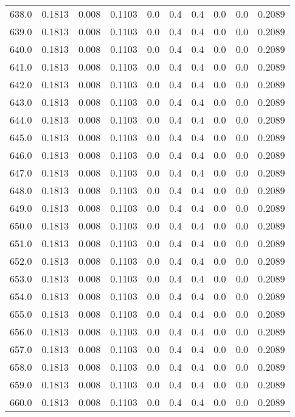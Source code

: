 \begin{longtable}{lrrrrrrrrr}
638.0 & 0.1813 & 0.008 & 0.1103 & 0.0 & 0.4 & 0.4 & 0.0 & 0.0 & 0.2089 \\
639.0 & 0.1813 & 0.008 & 0.1103 & 0.0 & 0.4 & 0.4 & 0.0 & 0.0 & 0.2089 \\
640.0 & 0.1813 & 0.008 & 0.1103 & 0.0 & 0.4 & 0.4 & 0.0 & 0.0 & 0.2089 \\
641.0 & 0.1813 & 0.008 & 0.1103 & 0.0 & 0.4 & 0.4 & 0.0 & 0.0 & 0.2089 \\
642.0 & 0.1813 & 0.008 & 0.1103 & 0.0 & 0.4 & 0.4 & 0.0 & 0.0 & 0.2089 \\
643.0 & 0.1813 & 0.008 & 0.1103 & 0.0 & 0.4 & 0.4 & 0.0 & 0.0 & 0.2089 \\
644.0 & 0.1813 & 0.008 & 0.1103 & 0.0 & 0.4 & 0.4 & 0.0 & 0.0 & 0.2089 \\
645.0 & 0.1813 & 0.008 & 0.1103 & 0.0 & 0.4 & 0.4 & 0.0 & 0.0 & 0.2089 \\
646.0 & 0.1813 & 0.008 & 0.1103 & 0.0 & 0.4 & 0.4 & 0.0 & 0.0 & 0.2089 \\
647.0 & 0.1813 & 0.008 & 0.1103 & 0.0 & 0.4 & 0.4 & 0.0 & 0.0 & 0.2089 \\
648.0 & 0.1813 & 0.008 & 0.1103 & 0.0 & 0.4 & 0.4 & 0.0 & 0.0 & 0.2089 \\
649.0 & 0.1813 & 0.008 & 0.1103 & 0.0 & 0.4 & 0.4 & 0.0 & 0.0 & 0.2089 \\
650.0 & 0.1813 & 0.008 & 0.1103 & 0.0 & 0.4 & 0.4 & 0.0 & 0.0 & 0.2089 \\
651.0 & 0.1813 & 0.008 & 0.1103 & 0.0 & 0.4 & 0.4 & 0.0 & 0.0 & 0.2089 \\
652.0 & 0.1813 & 0.008 & 0.1103 & 0.0 & 0.4 & 0.4 & 0.0 & 0.0 & 0.2089 \\
653.0 & 0.1813 & 0.008 & 0.1103 & 0.0 & 0.4 & 0.4 & 0.0 & 0.0 & 0.2089 \\
654.0 & 0.1813 & 0.008 & 0.1103 & 0.0 & 0.4 & 0.4 & 0.0 & 0.0 & 0.2089 \\
655.0 & 0.1813 & 0.008 & 0.1103 & 0.0 & 0.4 & 0.4 & 0.0 & 0.0 & 0.2089 \\
656.0 & 0.1813 & 0.008 & 0.1103 & 0.0 & 0.4 & 0.4 & 0.0 & 0.0 & 0.2089 \\
657.0 & 0.1813 & 0.008 & 0.1103 & 0.0 & 0.4 & 0.4 & 0.0 & 0.0 & 0.2089 \\
658.0 & 0.1813 & 0.008 & 0.1103 & 0.0 & 0.4 & 0.4 & 0.0 & 0.0 & 0.2089 \\
659.0 & 0.1813 & 0.008 & 0.1103 & 0.0 & 0.4 & 0.4 & 0.0 & 0.0 & 0.2089 \\
660.0 & 0.1813 & 0.008 & 0.1103 & 0.0 & 0.4 & 0.4 & 0.0 & 0.0 & 0.2089 \\

\end{longtable}
